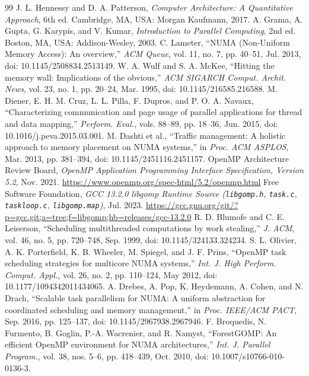 \documentclass[10pt,twocolumn,letterpaper]{article}
\begin{document}
{\footnotesize
\begin{thebibliography}{99}\setlength{\itemsep}{0pt}\setlength{\parskip}{0pt}
 J. L. Hennessy and D. A. Patterson, \textit{Computer Architecture: A Quantitative Approach}, 6th ed. Cambridge, MA, USA: Morgan Kaufmann, 2017.
 A. Grama, A. Gupta, G. Karypis, and V. Kumar, \textit{Introduction to Parallel Computing}, 2nd ed. Boston, MA, USA: Addison-Wesley, 2003.
 C. Lameter, ``NUMA (Non-Uniform Memory Access): An overview,'' \textit{ACM Queue}, vol. 11, no. 7, pp. 40--51, Jul. 2013, doi: 10.1145/2508834.2513149.
 W. A. Wulf and S. A. McKee, ``Hitting the memory wall: Implications of the obvious,'' \textit{ACM SIGARCH Comput. Archit. News}, vol. 23, no. 1, pp. 20--24, Mar. 1995, doi: 10.1145/216585.216588.
 M. Diener, E. H. M. Cruz, L. L. Pilla, F. Dupros, and P. O. A. Navaux, ``Characterizing communication and page usage of parallel applications for thread and data mapping,'' \textit{Perform. Eval.}, vols. 88--89, pp. 18--36, Jun. 2015, doi: 10.1016/j.peva.2015.03.001.
 M. Dashti et al., ``Traffic management: A holistic approach to memory placement on NUMA systems,'' in \textit{Proc. ACM ASPLOS}, Mar. 2013, pp. 381--394, doi: 10.1145/2451116.2451157.
 OpenMP Architecture Review Board, \textit{OpenMP Application Programming Interface Specification, Version 5.2}, Nov. 2021. \url{https://www.openmp.org/spec-html/5.2/openmp.html}
 Free Software Foundation, \textit{GCC 13.2.0 libgomp Runtime Source (\texttt{libgomp.h}, \texttt{task.c}, \texttt{taskloop.c}, \texttt{libgomp.map})}, Jul. 2023. \url{https://gcc.gnu.org/git/?p=gcc.git;a=tree;f=libgomp;hb=releases/gcc-13.2.0}
 R. D. Blumofe and C. E. Leiserson, ``Scheduling multithreaded computations by work stealing,'' \textit{J. ACM}, vol. 46, no. 5, pp. 720--748, Sep. 1999, doi: 10.1145/324133.324234.
 S. L. Olivier, A. K. Porterfield, K. B. Wheeler, M. Spiegel, and J. F. Prins, ``OpenMP task scheduling strategies for multicore NUMA systems,'' \textit{Int. J. High Perform. Comput. Appl.}, vol. 26, no. 2, pp. 110--124, May 2012, doi: 10.1177/1094342011434065.
 A. Drebes, A. Pop, K. Heydemann, A. Cohen, and N. Drach, ``Scalable task parallelism for NUMA: A uniform abstraction for coordinated scheduling and memory management,'' in \textit{Proc. IEEE/ACM PACT}, Sep. 2016, pp. 125--137, doi: 10.1145/2967938.2967946.
 F. Broquedis, N. Furmento, B. Goglin, P.-A. Wacrenier, and R. Namyst, ``ForestGOMP: An efficient OpenMP environment for NUMA architectures,'' \textit{Int. J. Parallel Program.}, vol. 38, nos. 5--6, pp. 418--439, Oct. 2010, doi: 10.1007/s10766-010-0136-3.

\end{thebibliography}}
\end{document}
